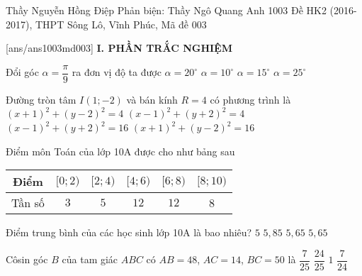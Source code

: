 \begin{name}
{Thầy Nguyễn Hồng Điệp \newline Phản biện: Thầy Ngô Quang Anh}
{1003 Đề HK2 (2016-2017), THPT Sông Lô, Vĩnh Phúc, Mã đề 003}%
	\end{name}
	\setcounter{ex}{0}\setcounter{bt}{0}
	[ans/ans1003md003]
\noindent\textbf{I. PHẦN TRẮC NGHIỆM}
\begin{ex}%
Đổi góc $\alpha=\dfrac{\pi}{9}$ ra đơn vị độ ta được
	\choice
	{\True $\alpha=20^\circ$}
	{$\alpha=10^\circ$}
	{$\alpha=15^\circ$}
	{$\alpha=25^\circ$}
\end{ex}
	
\begin{ex}%
Đường tròn tâm $I(1;-2)$ và bán kính $R=4$ có phương trình là
\choice	
{$(x+1)^2+(y-2)^2=4$}
{$(x-1)^2+(y+2)^2=4$}
{\True $(x-1)^2+(y+2)^2=16$}
{$(x+1)^2+(y-2)^2=16$}	

\end{ex}
\begin{ex}%
Điểm môn Toán của lớp 10A được cho như bảng sau

\begin{center}
\begin{tabular}{|c|c|c|c|c|c|}
	\hline
Điểm &$[0;2)$& $[2;4)$& $[4;6)$& $[6;8)$& $[8;10)$\\\hline
Tần số& $3$& $5$& $12$& $12$& 8\\ \hline
\end{tabular}
\end{center}
Điểm trung bình của các học sinh lớp 10A là bao nhiêu?
\choice	
{$5$}
{\True $5,85$}
{$5,65$}
{$5,65$}	
\end{ex}
\begin{ex}%
Côsin góc $B$ của tam giác $ABC$ có $AB=48$, $AC=14$, $BC=50$ là
	\choice	
	{ $\dfrac{7}{25}$}
	{\True$\dfrac{24}{25}$}
	{$1$}
	{$\dfrac{7}{24}$}	
\end{ex}


